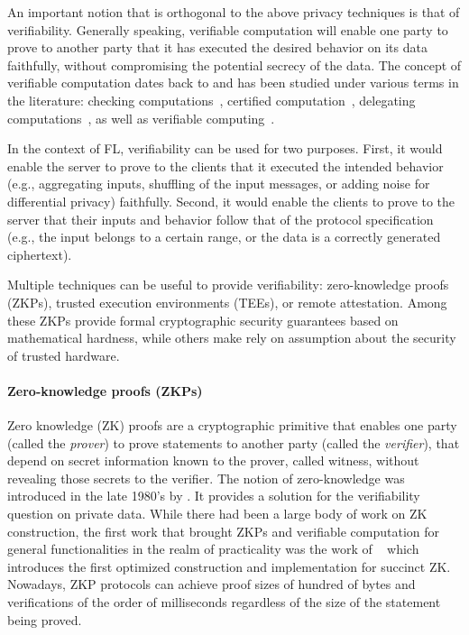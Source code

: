 An important notion that is orthogonal to the above privacy techniques is that of verifiability. Generally speaking, verifiable computation will enable one party to prove to another party that it has executed the desired behavior on its data faithfully, without compromising the potential secrecy of the data. The concept of verifiable computation dates back to \citet{DBLP:conf/stoc/BabaiFLS91} and has been studied under various terms in the literature: checking computations~\cite{DBLP:conf/stoc/BabaiFLS91}, certified computation~\cite{DBLP:journals/siamcomp/Micali00}, delegating computations~\cite{DBLP:conf/stoc/GoldwasserKR08}, as well as verifiable computing~\cite{DBLP:conf/crypto/GennaroGP10}.

In the context of FL, verifiability can be used for two purposes. First, it would enable the server to prove to the clients that it executed the intended behavior (e.g., aggregating inputs, shuffling of the input messages, or adding noise for differential privacy) faithfully. Second, it would enable the clients to prove to the server that their inputs and behavior follow that of the protocol specification (e.g., the input belongs to a certain range, or the data is a correctly generated ciphertext).

Multiple techniques can be useful to provide verifiability: zero-knowledge proofs (ZKPs), trusted execution environments (TEEs), or remote attestation. Among these ZKPs provide formal cryptographic security guarantees based on mathematical hardness, while others make rely on assumption about the security of trusted hardware.%

\paragraph{Zero-knowledge proofs (ZKPs)} Zero knowledge (ZK) proofs are a cryptographic primitive that enables one party (called the
\emph{prover}) to prove statements to another party (called the \emph{verifier}), that depend on secret
information known to the prover, called witness, without revealing those secrets to the verifier. The notion of zero-knowledge was introduced in the late 1980's by \citet{DBLP:journals/siamcomp/GoldwasserMR89}. It provides a solution for the verifiability question on private data. While 
there had been a large body of work on ZK construction, the first work that brought ZKPs and verifiable computation for general functionalities in the realm of practicality was the work of ~\citet{DBLP:journals/cacm/ParnoHG016} which introduces the first optimized construction and implementation for succinct ZK. Nowadays, ZKP protocols can achieve proof sizes of hundred of bytes and verifications of the order of milliseconds regardless of the size of the statement being proved.

